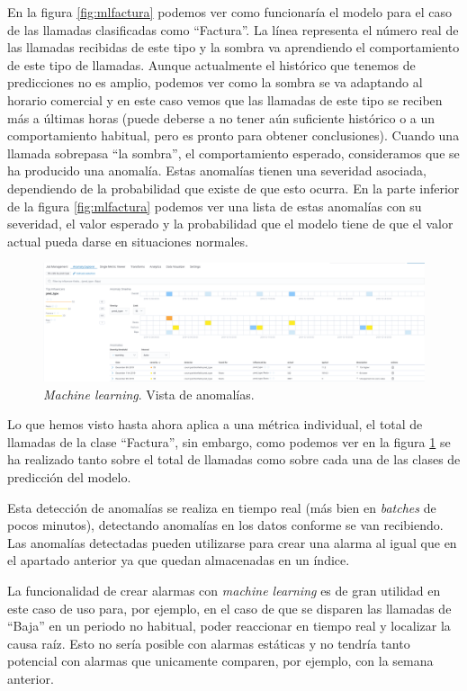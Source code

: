 En la figura \ref{fig:mlfactura} podemos ver como funcionaría el modelo para el caso de las llamadas clasificadas como ``Factura''. La línea representa el número real de las llamadas recibidas de este tipo y la sombra va aprendiendo el comportamiento de este tipo de llamadas.  Aunque actualmente el histórico que tenemos de predicciones no es amplio, podemos ver como la sombra se va adaptando al horario comercial y en este caso vemos que las llamadas de este tipo se reciben más a últimas horas (puede deberse a no tener aún suficiente histórico o a un comportamiento habitual, pero es pronto para obtener conclusiones). Cuando una llamada sobrepasa ``la sombra'', el comportamiento esperado, consideramos que se ha producido una anomalía.  Estas anomalías tienen una severidad asociada, dependiendo de la probabilidad que existe de que esto ocurra. En la parte inferior de la figura \ref{fig:mlfactura} podemos ver una lista de estas anomalías con su severidad, el valor esperado y la probabilidad que el modelo tiene de que el valor actual pueda darse en situaciones normales.  


\begin{figure}[!ht]
	\centering
	\includegraphics[width=1\textwidth]{images/serv/ml-total}
	\caption{\textit{Machine learning}. Vista de anomalías.}
	\label{fig:mlanom}
\end{figure}



Lo que hemos visto hasta ahora aplica a una métrica individual, el total de llamadas de la clase ``Factura'', sin embargo, como podemos ver en la figura \ref{fig:mlanom} se ha realizado tanto sobre el total de llamadas como sobre cada una de las clases de predicción del modelo. 

Esta detección de anomalías se realiza en tiempo real (más bien en \textit{batches} de pocos minutos), detectando anomalías en los datos conforme se van recibiendo. Las anomalías detectadas pueden utilizarse para crear una alarma al igual que en el apartado anterior ya que quedan almacenadas en un índice. 


La funcionalidad de crear alarmas con \textit{machine learning} es de gran utilidad en este caso de uso para, por ejemplo, en el caso de que se disparen las llamadas de ``Baja'' en un periodo no habitual, poder reaccionar en tiempo real y localizar la causa raíz. Esto no sería posible con alarmas estáticas y no tendría tanto potencial con alarmas que unicamente comparen, por ejemplo, con la semana anterior.





